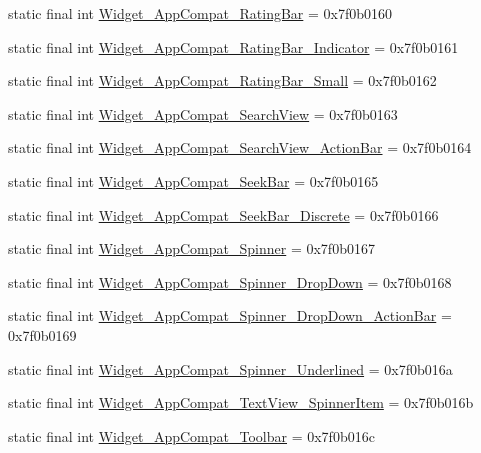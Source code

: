 \begin{CompactItemize}
static final int \hyperlink{classandroid_1_1support_1_1fragment_1_1_r_1_1style_71f668fb8d5e3c147db9c16562b68509}{Widget\_\-AppCompat\_\-RatingBar} = 0x7f0b0160
\item 
static final int \hyperlink{classandroid_1_1support_1_1fragment_1_1_r_1_1style_6717fccf31a735f282bfb08c93b0676e}{Widget\_\-AppCompat\_\-RatingBar\_\-Indicator} = 0x7f0b0161
\item 
static final int \hyperlink{classandroid_1_1support_1_1fragment_1_1_r_1_1style_d256da38e399c4d6542ee2d03306ba54}{Widget\_\-AppCompat\_\-RatingBar\_\-Small} = 0x7f0b0162
\item 
static final int \hyperlink{classandroid_1_1support_1_1fragment_1_1_r_1_1style_7ca107b1ea874b459955ca5c51a16d4a}{Widget\_\-AppCompat\_\-SearchView} = 0x7f0b0163
\item 
static final int \hyperlink{classandroid_1_1support_1_1fragment_1_1_r_1_1style_169e666c4d893148947f01544c40c341}{Widget\_\-AppCompat\_\-SearchView\_\-ActionBar} = 0x7f0b0164
\item 
static final int \hyperlink{classandroid_1_1support_1_1fragment_1_1_r_1_1style_3b60ea4a318bd6d81073414f7e7796bc}{Widget\_\-AppCompat\_\-SeekBar} = 0x7f0b0165
\item 
static final int \hyperlink{classandroid_1_1support_1_1fragment_1_1_r_1_1style_ef453dffd2d78e021b288db150df4219}{Widget\_\-AppCompat\_\-SeekBar\_\-Discrete} = 0x7f0b0166
\item 
static final int \hyperlink{classandroid_1_1support_1_1fragment_1_1_r_1_1style_45ff48bc03aee2e8d4f65dd73d66f49c}{Widget\_\-AppCompat\_\-Spinner} = 0x7f0b0167
\item 
static final int \hyperlink{classandroid_1_1support_1_1fragment_1_1_r_1_1style_847723b77e98ec33c4aad238a6441561}{Widget\_\-AppCompat\_\-Spinner\_\-DropDown} = 0x7f0b0168
\item 
static final int \hyperlink{classandroid_1_1support_1_1fragment_1_1_r_1_1style_e7dd21933b2154a2dede6c84b7bfe883}{Widget\_\-AppCompat\_\-Spinner\_\-DropDown\_\-ActionBar} = 0x7f0b0169
\item 
static final int \hyperlink{classandroid_1_1support_1_1fragment_1_1_r_1_1style_58b5f7435c555a21b7c2e87f2b419877}{Widget\_\-AppCompat\_\-Spinner\_\-Underlined} = 0x7f0b016a
\item 
static final int \hyperlink{classandroid_1_1support_1_1fragment_1_1_r_1_1style_7148ead486c1a6fcf774867963dbadcd}{Widget\_\-AppCompat\_\-TextView\_\-SpinnerItem} = 0x7f0b016b
\item 
static final int \hyperlink{classandroid_1_1support_1_1fragment_1_1_r_1_1style_6c5ba3e2ec9cb731cf6efd3f4439488c}{Widget\_\-AppCompat\_\-Toolbar} = 0x7f0b016c

\end{CompactItemize}
